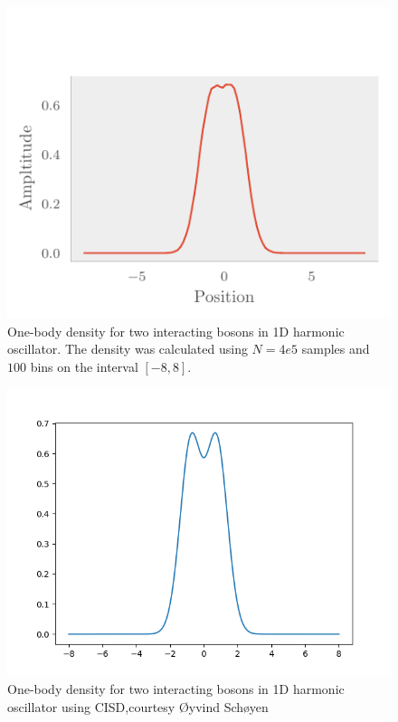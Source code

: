 \begin{figure}[H]
	\includegraphics[]{figures/many_part_int_training1.pdf}
	\caption{One-body density for two interacting bosons in 1D harmonic oscillator. The density was calculated using $N=4e5$ samples and $100$ bins on the interval $[-8,8]$.}
	\label{fig:many_part_int_onebody}
\end{figure}

\begin{figure}[H]
	\includegraphics[scale = 0.4]{figures/oyvind.png}
	\caption{One-body density for two interacting bosons in 1D harmonic oscillator using CISD,courtesy Øyvind Schøyen}
	\label{fig:many_part_int_onebody}
\end{figure}

